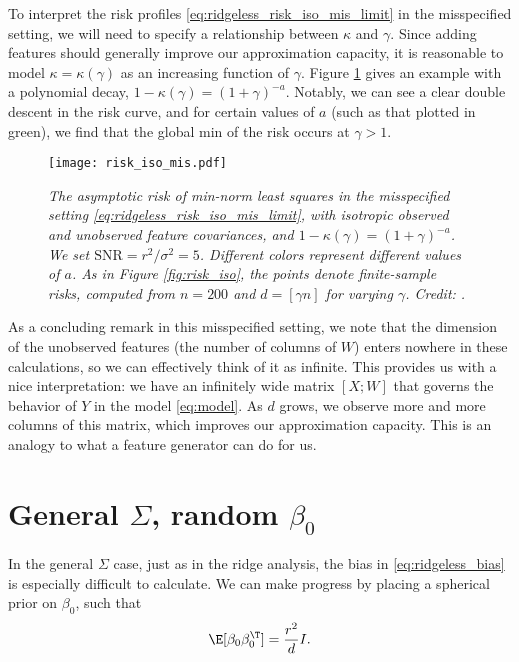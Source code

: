 \documentclass{article}
\begin{document}
To interpret the risk profiles \eqref{eq:ridgeless_risk_iso_mis_limit} in the 
misspecified setting, we will need to specify a relationship between $\kappa$
and $\gamma$. Since adding features should generally improve our approximation
capacity, it is reasonable to model $\kappa=\kappa(\gamma)$ as an increasing 
function of $\gamma$. Figure \ref{fig:risk_iso_mis} gives an example with a
polynomial decay, $1-\kappa(\gamma) = (1+\gamma)^{-a}$. Notably, we can see a
clear double descent in the risk curve, and for certain values of $a$ (such as
that plotted in green), we find that the global min of the risk occurs at
$\gamma > 1$.  

\begin{figure}[htb]
\centering
\texttt{[image: risk\_iso\_mis.pdf]}
\caption{\it The asymptotic risk of min-norm least squares in the misspecified
  setting \eqref{eq:ridgeless_risk_iso_mis_limit}, with isotropic observed and 
  unobserved feature covariances, and $1-\kappa(\gamma) = (1+\gamma)^{-a}$. We
  set $\mathrm{SNR} = r^2 / \sigma^2 = 5$. Different colors represent different
  values of $a$. As in Figure \ref{fig:risk_iso}, the points denote
  finite-sample risks, computed from $n=200$ and $d=[\gamma n]$ for varying 
  $\gamma$. Credit: \citet{hastie2022surprises}.}   
\label{fig:risk_iso_mis}
\end{figure}

As a concluding remark in this misspecified setting, we note that the dimension
of the unobserved features (the number of columns of $W$) enters nowhere in
these calculations, so we can effectively think of it as infinite. This provides
us with a nice interpretation: we have an infinitely wide matrix $[X; W]$ that 
governs the behavior of $Y$ in the model \eqref{eq:model}. As $d$ grows, we
observe more and more columns of this matrix, which improves our approximation
capacity. This is an analogy to what a feature generator can do for us.       

\section{General $\Sigma$, random $\beta_0$}

In the general $\Sigma$ case, just as in the ridge analysis, the bias in 
\eqref{eq:ridgeless_bias} is especially difficult to calculate. We can make
progress by placing a spherical prior on $\beta_0$, such that        
\begin{equation}
\label{eq:prior}
\E[\beta_0 \beta_0^\T] = \frac{r^2}{d} I.
\end{equation}
\end{document}
